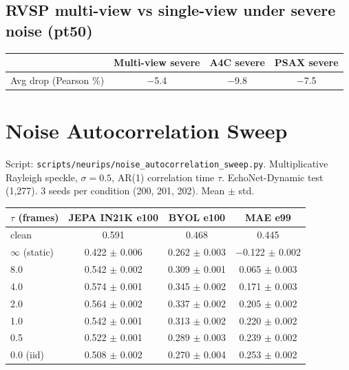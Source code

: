 \documentclass{article}
\begin{document}
\subsection{RVSP multi-view vs single-view under severe noise (pt50)}

\begin{center}
\begin{tabular}{lccc}
\toprule
& Multi-view severe & A4C severe & PSAX severe \\
\midrule
Avg drop (Pearson \%) & $-$5.4 & $-$9.8 & $-$7.5 \\
\bottomrule
\end{tabular}
\end{center}

\section{Noise Autocorrelation Sweep}

Script: \texttt{scripts/neurips/noise\_autocorrelation\_sweep.py}. Multiplicative Rayleigh speckle, $\sigma=0.5$, AR(1) correlation time $\tau$. EchoNet-Dynamic test (1{,}277). 3 seeds per condition (200, 201, 202). Mean $\pm$ std.

\begin{center}
\begin{tabular}{lccc}
\toprule
$\tau$ (frames) & JEPA IN21K e100 & BYOL e100 & MAE e99 \\
\midrule
clean       & 0.591 & 0.468 & 0.445 \\
$\infty$ (static) & 0.422 $\pm$ 0.006 & 0.262 $\pm$ 0.003 & $-$0.122 $\pm$ 0.002 \\
8.0         & 0.542 $\pm$ 0.002 & 0.309 $\pm$ 0.001 & 0.065 $\pm$ 0.003 \\
4.0         & 0.574 $\pm$ 0.001 & 0.345 $\pm$ 0.002 & 0.171 $\pm$ 0.003 \\
2.0         & 0.564 $\pm$ 0.002 & 0.337 $\pm$ 0.002 & 0.205 $\pm$ 0.002 \\
1.0         & 0.542 $\pm$ 0.001 & 0.313 $\pm$ 0.002 & 0.220 $\pm$ 0.002 \\
0.5         & 0.522 $\pm$ 0.001 & 0.289 $\pm$ 0.003 & 0.239 $\pm$ 0.002 \\
0.0 (iid)   & 0.508 $\pm$ 0.002 & 0.270 $\pm$ 0.004 & 0.253 $\pm$ 0.002 \\
\bottomrule
\end{tabular}
\end{center}
\end{document}
